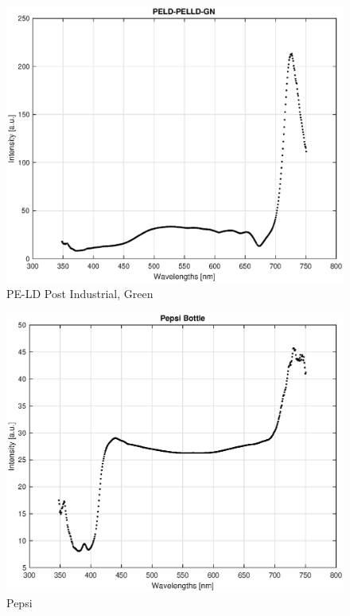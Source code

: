 \begin{appendices}
\begin{figure}
    \centering
    \includegraphics[width = 12cm]{Images/appendix/pe-ld-postindust-green.eps}
    \caption[$\; \:$PE-LD Post Industrial, Green]{PE-LD Post Industrial, Green}
\end{figure}

\begin{figure}
    \centering
    \includegraphics[width = 12cm]{Images/appendix/pepsi.eps}
    \caption[$\; \:$Pepsi]{Pepsi}
    \label{fig:pepsi}
\end{figure}


\end{appendices}
